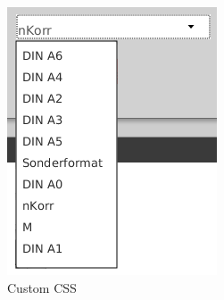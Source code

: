 \begin{figure}
\begin{subfigure}[b]{0.3\textwidth}
                \includegraphics[width=\textwidth]{./img/impl/context_menu_css.png}
                \caption{Custom CSS}
                \label{fig:context_menu_css}
        \end{subfigure}
        ~ %
        \begin{subfigure}[b]{0.3\textwidth}

\end{subfigure}
\end{figure}
